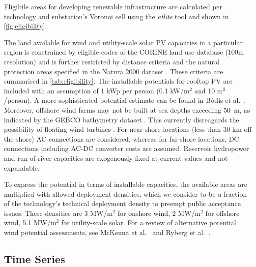Eligibile areas for developing renewable infrastructure are calculated per
technology and substation's Voronoi cell using the
\textit{atlite} tool  and shown in
\cref{fig:eligibility}.

The land available for wind and utility-scale solar PV capacities in a
particular region is constrained by eligible codes of the
CORINE  land use database  (100m
resolution)  and is further restricted by distance criteria and the natural
protection areas specified in the Natura
2000 dataset . These criteria are
summarised in \cref{tab:eligibility}. The installable potentials for rooftop PV
are included with an assumption of 1 kWp per person (0.1 kW/m$^2$ and 10
m$^2$/person). A more sophisticated potential estimate can be found in Bódis et
al.~. Moreover, offshore wind farms may
not be built at sea depths exceeding \SI{50}{\metre}, as indicated by the GEBCO
bathymetry dataset . This currently disreagards the
possibility of floating wind turbines
.
For near-shore locations (less than 30 km off the shore) AC connections are
considered, whereas for far-shore locations, DC connections including AC-DC
converter costs are assumed. Reservoir hydropower and run-of-river capacities
are exogenously fixed at current values and not expandable.

To express the potential in terms of installable capacities, the available areas
are multiplied with allowed deployment densities, which we consider to be a
fraction of the technology's technical deployment density to preempt public
acceptance issues. These densities are 3 MW/m$^ 2$ for onshore wind, 2 MW/m$^2$
for offshore wind, 5.1 MW/m$^2$ for utility-scale solar. For a review of
alternative potential wind potential assessments, see McKenna et
al.~ and Ryberg et
al.~.


\subsection{Time Series}
\label{sec:si:renewable-ts}

